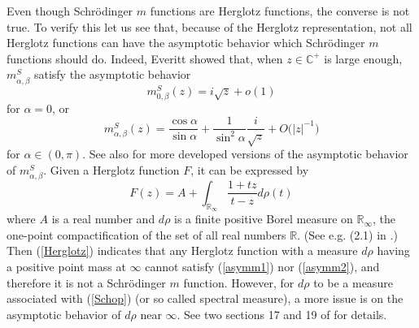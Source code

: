\documentclass[preprint,12pt]{elsarticle}
\newcommand{\R}{{\mathbb R}}
\newcommand{\C}{{\mathbb C}}
\begin{document}
Even though Schr\"odinger $m$ functions are Herglotz functions, the converse is not true. To verify this let us see that, because of the Herglotz representation, not all Herglotz functions can have the asymptotic behavior which Schr\"odinger $m$ functions should do. Indeed,  Everitt \cite{Eve} showed that, when $z\in\C^+$ is large enough,  $m_{\alpha,\beta}^S$ satisfy the asymptotic behavior  
\begin{equation}
\label{asymm1}
m_{0,\beta}^S(z)=i\sqrt{z}+o(1) 
\end{equation}
for $\alpha=0$, or
\begin{equation}
\label{asymm2}
m_{\alpha,\beta}^S(z)= \frac{\cos\alpha}{\sin\alpha}+\frac1{\sin^2 \alpha}\frac{i}{\sqrt{z}}
+O \big( |z|^{-1} \big)
\end{equation}
for $\alpha\in (0,\pi)$. See also \cite{Atk,Har} for more developed versions of the asymptotic behavior of $m_{\alpha,\beta}^S$. 
%
Given a Herglotz function $F$, it can be expressed by  
\begin{equation}
\label{Herglotz}
F(z)=A+\int_{\R_{\infty}} \frac{1+tz}{t-z} d\rho(t)
\end{equation}
where $A$ is a real number and $d\rho$ is a finite positive Borel measure on $\R_{\infty}$, the one-point compactification of the set of all real numbers $\R$. (See e.g.  (2.1) in \cite{Remac}.) Then (\ref{Herglotz}) indicates that any Herglotz function with a measure $d\rho$ having a positive point mass at $\infty$ cannot satisfy (\ref{asymm1}) nor (\ref{asymm2}), and therefore it is not a Schr\"odinger $m$ function. However, for $d\rho$ to be a measure associated with  (\ref{Schop}) (or so called spectral measure), a more issue is on the asymptotic behavior of $d\rho$ near $\infty$. See two sections 17 and 19 of \cite{RemdB} for details.\\
\end{document}
